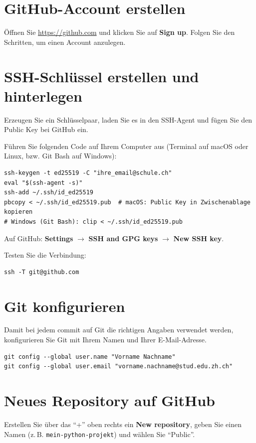 \section*{GitHub-Account erstellen}
Öffnen Sie \url{https://github.com} und klicken Sie auf \textbf{Sign up}. Folgen Sie den Schritten, um einen Account anzulegen.

\section*{SSH-Schlüssel erstellen und hinterlegen}
Erzeugen Sie ein Schlüsselpaar, laden Sie es in den SSH-Agent und fügen Sie den Public Key bei GitHub ein.

Führen Sie folgenden Code auf Ihrem Computer aus (Terminal auf macOS oder Linux, bzw. Git Bash auf Windows):
\begin{lstlisting}[style=bash]
ssh-keygen -t ed25519 -C "ihre_email@schule.ch"
eval "$(ssh-agent -s)"
ssh-add ~/.ssh/id_ed25519
pbcopy < ~/.ssh/id_ed25519.pub  # macOS: Public Key in Zwischenablage kopieren
# Windows (Git Bash): clip < ~/.ssh/id_ed25519.pub
\end{lstlisting}


Auf GitHub: \textbf{Settings} $\rightarrow$ \textbf{SSH and GPG keys} $\rightarrow$ \textbf{New SSH key}.

Testen Sie die Verbindung:
\begin{lstlisting}[style=bash]
ssh -T git@github.com
\end{lstlisting}

\section*{Git konfigurieren}
Damit bei jedem commit auf Git die richtigen Angaben verwendet werden, konfigurieren Sie Git mit Ihrem Namen und Ihrer E-Mail-Adresse.

\begin{lstlisting}[style=bash]
git config --global user.name "Vorname Nachname"
git config --global user.email "vorname.nachname@stud.edu.zh.ch"
\end{lstlisting}

\section*{Neues Repository auf GitHub}
Erstellen Sie über das \enquote{+} oben rechts ein \textbf{New repository}, geben Sie einen Namen (z.\,B. \lstinline|mein-python-projekt|) und wählen Sie \enquote{Public}.



